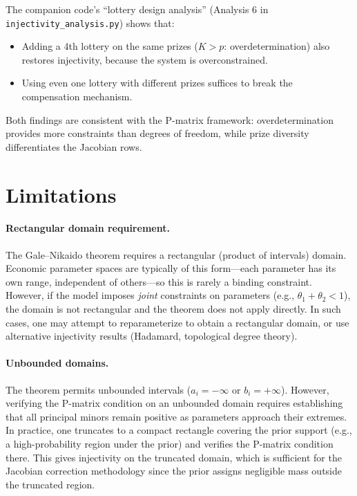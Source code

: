 \documentclass[11pt,a4paper]{article}
\theoremstyle{definition}
\begin{document}
The companion code's ``lottery design analysis'' (Analysis 6 in
\texttt{injectivity\_analysis.py}) shows that:
\begin{itemize}
    \item Adding a 4th lottery on the same prizes ($K > p$: overdetermination)
    also restores injectivity, because the system is overconstrained.
    \item Using even one lottery with different prizes suffices to break the
    compensation mechanism.
\end{itemize}

Both findings are consistent with the P-matrix framework: overdetermination
provides more constraints than degrees of freedom, while prize diversity
differentiates the Jacobian rows.


\section{Limitations}
\label{sec:limitations}

\paragraph{Rectangular domain requirement.}
The Gale--Nikaido theorem requires a rectangular (product of intervals) domain.
Economic parameter spaces are typically of this form---each parameter has its
own range, independent of others---so this is rarely a binding constraint.
However, if the model imposes \emph{joint} constraints on parameters (e.g.,
$\theta_1 + \theta_2 < 1$), the domain is not rectangular and the theorem
does not apply directly. In such cases, one may attempt to reparameterize to
obtain a rectangular domain, or use alternative injectivity results (Hadamard,
topological degree theory).

\paragraph{Unbounded domains.}
The theorem permits unbounded intervals ($a_i = -\infty$ or $b_i = +\infty$).
However, verifying the P-matrix condition on an unbounded domain requires
establishing that all principal minors remain positive as parameters approach
their extremes. In practice, one truncates to a compact rectangle covering the
prior support (e.g., a high-probability region under the prior) and verifies the
P-matrix condition there. This gives injectivity on the truncated domain, which
is sufficient for the Jacobian correction methodology since the prior assigns
negligible mass outside the truncated region.
\end{document}

